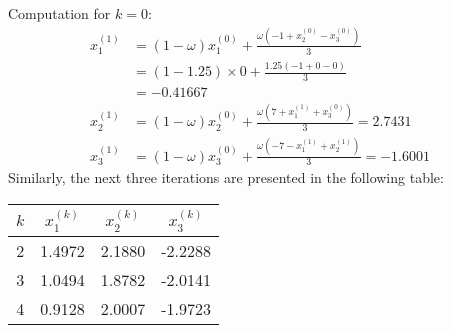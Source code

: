\documentclass[../main-sheet.tex]{subfiles}
\begin{document}
\begin{soln}
\begin{enumerate}[label=(\roman*)]
            Computation for \(k=0\):
            \begin{align*}
                x_1^{(1)} &= (1-\omega)x_1^{(0)}+ \frac{\omega\left( -1+x_2^{(0)}-x_3^{(0)} \right)}{3}\\
                &= (1-1.25)\times 0+ \frac{1.25\left( -1+0-0 \right)}{3}\\
                &= -0.41667\\
                x_2^{(1)} &=(1-\omega)x_2^{(0)}+ \frac{\omega\left( 7+x_1^{(1)}+x_3^{(0)} \right)}{3}=2.7431\\
                x_3^{(1)} &= (1-\omega)x_3^{(0)}+\frac{\omega\left( -7-x_1^{(1)}+x_2^{(1)} \right)}{3}=-1.6001
            \end{align*}
            Similarly, the next three iterations are presented in the following table:
            \begin{table}[H]
                \centering
                \begin{tabular}{cccc}
                \toprule
                \(k\) & \(x_1^{(k)}\) & \(x_2^{(k)}\) & \(x_3^{(k)}\) \\ \midrule
                2 & 1.4972 & 2.1880 & -2.2288 \\
                3 & 1.0494 & 1.8782 & -2.0141 \\
                4 & 0.9128 & 2.0007 & -1.9723 \\ \bottomrule
                \end{tabular}
            \end{table}
        \end{enumerate}
\end{soln}
\end{document}
